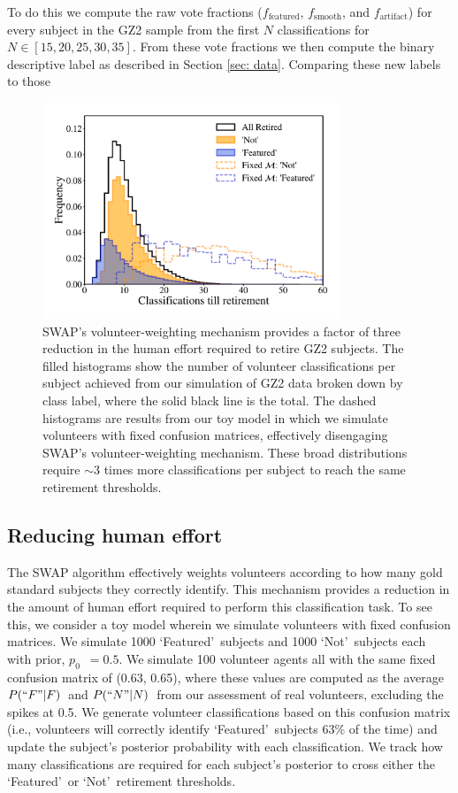 \documentclass[twocolumn,  trackchanges,]{aastex6}%
\newcommand{\Pf}{$P(``F"|F)$}
\newcommand{\Pn}{$P(``N"|N)$}
\newcommand{\p}{$p_0$}
\newcommand{\feat}{`Featured'}
\newcommand{\notfeat}{`Not'}
\newcommand{\ffeat}{$f_{\mathrm{featured}}$}
\newcommand{\fsmooth}{$f_{\mathrm{smooth}}$}
\newcommand{\fstar}{$f_{\mathrm{artifact}}$}
\begin{document}
To do this we compute the raw vote fractions (\ffeat, \fsmooth, and \fstar) for every subject in the GZ2 sample from the first $N$ classifications for $N \in [15, 20, 25, 30, 35]$. From these vote fractions we then compute the binary descriptive label as described in Section \ref{sec: data}. Comparing these new labels to those 


\begin{figure}[t!] 
\centering
\includegraphics[width=3.5in]{f4.pdf}
\caption{
SWAP's volunteer-weighting mechanism provides a factor of three reduction in the human effort required to retire GZ2 subjects. The filled histograms show the number of volunteer classifications per subject achieved from our simulation of GZ2 data broken down by class label, where the solid black line is the total. The dashed histograms are results from our toy model in which we simulate volunteers with fixed confusion matrices, effectively disengaging SWAP's volunteer-weighting mechanism. These broad distributions require $\sim$3 times more classifications per subject to reach the same retirement thresholds.  } \label{fig: swap vote distributions}
\end{figure}

\subsection{Reducing human effort}
The SWAP algorithm effectively weights volunteers according to how many gold 
standard subjects they correctly identify. This mechanism provides a reduction 
in the amount of human effort required to perform this classification task. 
To see this, we consider a toy model wherein we simulate volunteers with fixed 
confusion matrices. We simulate 1000 \feat~subjects and 1000 \notfeat~subjects 
each with prior, \p~$ = 0.5$. We simulate 100 volunteer agents all with the same 
fixed confusion matrix of (0.63, 0.65), where these values are computed as the 
average \Pf~and \Pn~from our assessment of real volunteers, excluding the spikes at 0.5. 
We generate volunteer classifications based on this confusion matrix 
(i.e., volunteers will correctly identify \feat~subjects 63\% of the time) 
and update the subject's posterior probability with each classification. 
We track how many classifications are required for each subject's posterior to 
cross either the \feat~or \notfeat~retirement thresholds. 
\end{document}
